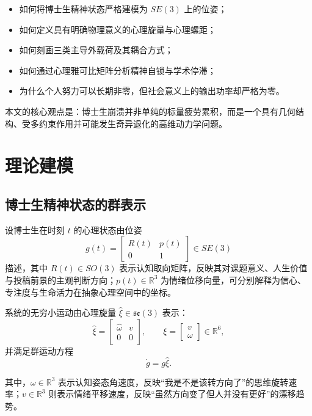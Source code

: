 \documentclass[UTF8,twocolumn,a4paper]{ctexart}
\begin{document}
\begin{itemize}
  \item 如何将博士生精神状态严格建模为 $SE(3)$ 上的位姿；
  \item 如何定义具有明确物理意义的心理旋量与心理螺距；
  \item 如何刻画三类主导外载荷及其耦合方式；
  \item 如何通过心理雅可比矩阵分析精神自锁与学术停滞；
  \item 为什么个人努力可以长期非零，但社会意义上的输出功率却严格为零。
\end{itemize}

本文的核心观点是：博士生崩溃并非单纯的标量疲劳累积，而是一个具有几何结构、受多约束作用并可能发生奇异退化的高维动力学问题。

\section{理论建模}

\subsection{博士生精神状态的群表示}

设博士生在时刻 $t$ 的心理状态由位姿
\begin{equation}
g(t)=
\begin{bmatrix}
R(t) & p(t)\\
0 & 1
\end{bmatrix}\in SE(3)
\end{equation}
描述，其中 $R(t)\in SO(3)$ 表示认知取向矩阵，反映其对课题意义、人生价值与投稿前景的主观判断方向；$p(t)\in\mathbb{R}^3$ 为情绪位移向量，可分别解释为信心、专注度与生命活力在抽象心理空间中的坐标。

系统的无穷小运动由心理旋量 $\hat{\xi}\in\mathfrak{se}(3)$ 表示：
\begin{equation}
\hat{\xi}=
\begin{bmatrix}
\hat{\omega} & v\\
0 & 0
\end{bmatrix},\qquad
\xi=
\begin{bmatrix}
v\\
\omega
\end{bmatrix}\in\mathbb{R}^6,
\end{equation}
并满足群运动方程
\begin{equation}
\dot{g}=g\hat{\xi}.
\end{equation}

其中，$\omega\in\mathbb{R}^3$ 表示认知姿态角速度，反映“我是不是该转方向了”的思维旋转速率；$v\in\mathbb{R}^3$ 则表示情绪平移速度，反映“虽然方向变了但人并没有更好”的漂移趋势。
\end{document}
